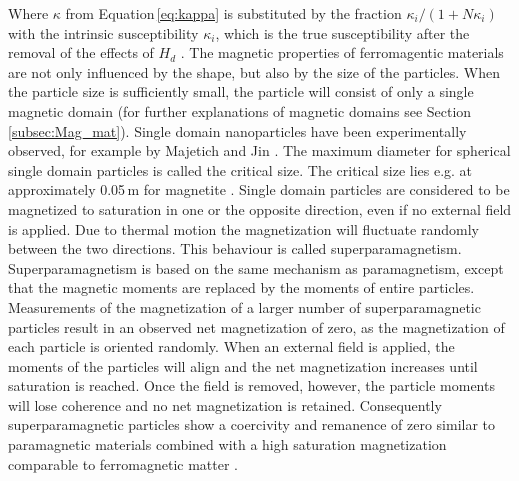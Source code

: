 Where $\kappa$ from Equation\,\ref{eq:kappa} is substituted by the fraction $\kappa_{i}/(1+N\kappa_{i})$ with the intrinsic susceptibility $\kappa_{i}$, which is the true susceptibility after the removal of the effects of $H_{d}$ \cite{FranzrebHabil,svoboda2004magnetic}.\newline 
The magnetic properties of ferromagentic materials are not only influenced by the shape, but also by the size of the particles. When the particle size is sufficiently small, the particle will consist of only a single magnetic domain (for further explanations of magnetic domains see Section\,\ref{subsec:Mag_mat}). Single domain nanoparticles have been experimentally observed, for example by Majetich and Jin \cite{majetich1999magnetization}. The maximum diameter for spherical single domain particles is called the critical size. The critical size lies e.g. at approximately 0.05\,\textmu m for magnetite \cite{svoboda2004magnetic,butler1975theoretical}. Single domain particles are considered to be magnetized to saturation in one or the opposite direction, even if no external field is applied. Due to thermal motion the magnetization will fluctuate randomly between the two directions. This behaviour is called superparamagnetism.
Superparamagnetism is based on the same mechanism as paramagnetism, except that the magnetic moments are replaced by the moments of entire particles. Measurements of the magnetization of a larger number of superparamagnetic particles result in an observed net magnetization of zero, as the magnetization of each particle is oriented randomly. When an external field is applied, the moments of the particles will align and the net magnetization increases until saturation is reached. Once the field is removed, however, the particle moments will lose coherence and no net magnetization is retained. Consequently superparamagnetic particles show a coercivity and remanence of zero similar to paramagnetic materials combined with a high saturation magnetization comparable to ferromagnetic matter \cite{svoboda2004magnetic,FranzrebHabil}.      
    
